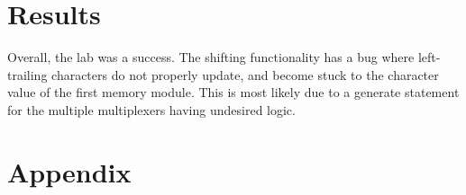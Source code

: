 \documentclass[paper=a4, fontsize=11pt,twoside]{scrartcl}
\begin{document}
\section{Results}\label{result}
Overall, the lab was a success. The shifting functionality has a bug where left-trailing characters do not properly update, and become stuck to the character value of the first memory module. This is most likely due to a generate statement for the multiple multiplexers having undesired logic. 




\section{Appendix}\label{appendix}
\end{document}
